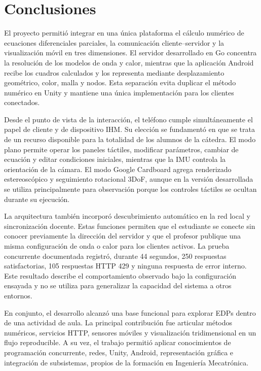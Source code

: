 \documentclass[12pt, a4paper]{article}
\begin{document}
\newpage

\section{Conclusiones}

El proyecto permitió integrar en una única plataforma el cálculo numérico de ecuaciones
diferenciales parciales, la comunicación cliente--servidor y la visualización móvil en
tres dimensiones. El servidor desarrollado en Go concentra la resolución de los modelos
de onda y calor, mientras que la aplicación Android recibe los cuadros calculados y los
representa mediante desplazamiento geométrico, color, malla y nodos. Esta separación
evita duplicar el método numérico en Unity y mantiene una única implementación para los
clientes conectados.

Desde el punto de vista de la interacción, el teléfono cumple simultáneamente el papel
de cliente y de dispositivo IHM. Su elección se fundamentó en que se trata de un recurso
disponible para la totalidad de los alumnos de la cátedra. El modo plano permite operar
los paneles táctiles, modificar parámetros, cambiar de ecuación y editar condiciones
iniciales, mientras que la IMU controla la orientación de la cámara. El modo Google
Cardboard agrega renderizado estereoscópico y seguimiento rotacional 3DoF, aunque en la
versión desarrollada se utiliza principalmente para observación porque los controles
táctiles se ocultan durante su ejecución.

La arquitectura también incorporó descubrimiento automático en la red local y
sincronización docente. Estas funciones permiten que el estudiante se conecte sin
conocer previamente la dirección del servidor y que el profesor publique una misma
configuración de onda o calor para los clientes activos. La prueba concurrente
documentada registró, durante 44 segundos, 250 respuestas satisfactorias, 105 respuestas
HTTP 429 y ninguna respuesta de error interno. Este resultado describe el comportamiento
observado bajo la configuración ensayada y no se utiliza para generalizar la capacidad
del sistema a otros entornos.

En conjunto, el desarrollo alcanzó una base funcional para explorar EDPs dentro de una
actividad de aula. La principal contribución fue articular métodos numéricos, servicios
HTTP, sensores móviles y visualización tridimensional en un flujo reproducible. A su
vez, el trabajo permitió aplicar conocimientos de programación concurrente, redes,
Unity, Android, representación gráfica e integración de subsistemas, propios de la
formación en Ingeniería Mecatrónica.
\end{document}
